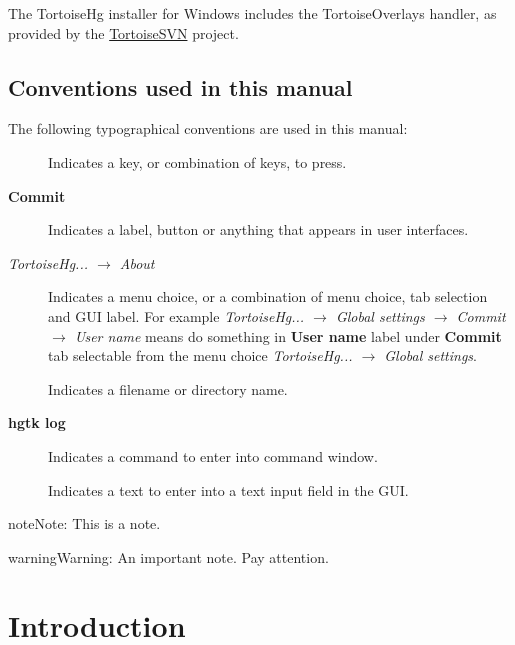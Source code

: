 \documentclass[letterpaper,10pt,english]{manual}
\begin{document}
The TortoiseHg installer for Windows includes the TortoiseOverlays handler,
as provided by the \href{http://tortoisesvn.net}{TortoiseSVN} project.


\section{Conventions used in this manual}

The following typographical conventions are used in this manual:
\begin{description}
\item[]
Indicates a key, or combination of keys, to press.

\item[\textbf{Commit}]
Indicates a label, button or anything that appears in user interfaces.

\item[\emph{TortoiseHg... \(\rightarrow\) About}]
Indicates a menu choice, or a combination of menu choice, tab
selection and GUI label.  For example
\emph{TortoiseHg...  \(\rightarrow\) Global settings \(\rightarrow\) Commit \(\rightarrow\) User name}
means do something in \textbf{User name} label under
\textbf{Commit} tab selectable from the menu choice
\emph{TortoiseHg... \(\rightarrow\) Global settings}.

\item[]
Indicates a filename or directory name.

\item[\textbf{hgtk log}]
Indicates a command to enter into command window.

\item[]
Indicates a text to enter into a text input field in the GUI.

\end{description}

\begin{notice}{note}{Note:}
This is a note.
\end{notice}

\begin{notice}{warning}{Warning:}
An important note. Pay attention.
\end{notice}

\resetcurrentobjects
\hypertarget{--doc-intro}{}

\chapter{Introduction}
\hypertarget{module-introduction}{}
\end{document}
